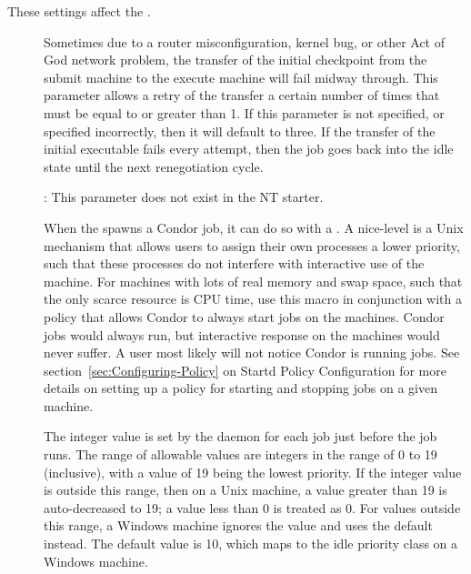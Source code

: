 These settings affect the .
\begin{description}

\item[] \label{param:ExecTransferAttempts}
  Sometimes due to a router misconfiguration, kernel bug, or other Act
  of God network problem, the transfer of the initial checkpoint from
  the submit machine to the execute machine will fail midway through.
  This parameter allows a retry of the transfer a certain number of times
  that must be equal to or greater than 1. If this parameter is not
  specified, or specified incorrectly, then it will default to three.
  If the transfer of the initial executable fails every attempt, then
  the job goes back into the idle state until the next renegotiation
  cycle.

  \Note: This parameter does not exist in the NT starter.

\item[] \label{param:JobReniceIncrement}
  When the  spawns a Condor job, it can do so with a
  .
  A nice-level is a
  Unix mechanism that allows users to assign their own processes a lower 
  priority, such that these processes do not interfere with interactive
  use of the machine.
  For machines with lots
  of real memory and swap space, such that the only scarce resource is CPU time,
  use this macro in conjunction with a policy that
  allows Condor to always start jobs on the machines. 
  Condor jobs would always run,
  but interactive response on the machines would never suffer.
  A user most likely will not notice Condor is
  running jobs.  See section~\ref{sec:Configuring-Policy} on
  Startd Policy Configuration for more details on setting up a
  policy for starting and stopping jobs on a given machine.

  The integer value is
  set by the  daemon for each job just before the
  job runs.
  The range of allowable values are integers in the range of 0 to 19
  (inclusive),
  with a value of 19 being the lowest priority.  
  If the integer value is outside this range,
  then on a Unix machine, a value greater than 19 is auto-decreased to 19;
  a value less than 0 is treated as 0.
  For values outside this range, a Windows machine ignores the value
  and uses the default instead.
  The default value is 10, which maps to the idle priority class on
  a Windows machine.


\end{description}

